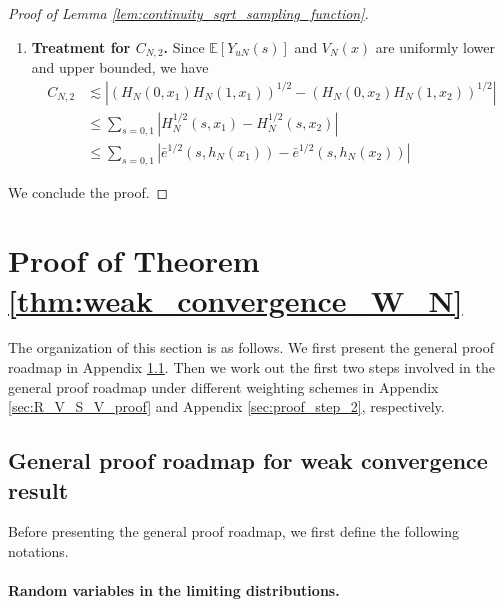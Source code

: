 \documentclass[12pt]{article}
\newcommand{\E}{\mathbb E}								%
\begin{document}
\begin{proof}[Proof of Lemma \ref{lem:continuity_sqrt_sampling_function}]
\begin{enumerate}
		\item \textbf{Treatment for $C_{N,2}$.} Since $\E[Y_{uN}(s)]$ and $V_N(x)$ are uniformly lower and upper bounded, we have
		\begin{align*}
			C_{N,2}
			&
			\lesssim \left|(H_N(0,x_1)H_N(1,x_1))^{1/2}-(H_N(0,x_2)H_N(1,x_2))^{1/2}\right|\\
			&
			\leq \sum_{s=0,1}|H_N^{1/2}(s,x_1)-H_N^{1/2}(s,x_2)|\\
			&
			\leq \sum_{s=0,1}|\bar e^{1/2}(s,h_N(x_1))-\bar e^{1/2}(s,h_N(x_2))|
		\end{align*}
	\end{enumerate}
	We conclude the proof.
\end{proof}



\section{Proof of Theorem \ref{thm:weak_convergence_W_N}}\label{sec:proof_weak_convergence}

The organization of this section is as follows. We first present the general proof roadmap in Appendix \ref{sec:proof_roadmap}. Then we work out the first two steps involved in the general proof roadmap under different weighting schemes in Appendix \ref{sec:R_V_S_V_proof} and Appendix \ref{sec:proof_step_2}, respectively. 





\subsection{General proof roadmap for weak convergence result}\label{sec:proof_roadmap}

Before presenting the general proof roadmap, we first define the following notations. 

\paragraph{Random variables in the limiting distributions.}
\end{document}
